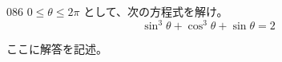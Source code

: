 \begin{thm}{086}{}{}
 $0 \le \theta \le 2\pi$ として、次の方程式を解け。 \\
 \[ \sin^3\theta+\cos^3\theta+\sin\theta=2 \]
\end{thm}

ここに解答を記述。